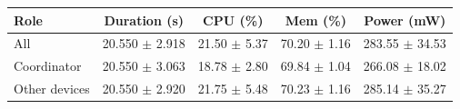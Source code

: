 \begin{tabular}{lcccc}
\hline
\textbf{Role} & \textbf{Duration (s)} & \textbf{CPU (\%)} & \textbf{Mem (\%)} & \textbf{Power (mW)} \\
\hline
All & 20.550 $\pm$ 2.918 & 21.50 $\pm$ 5.37 & 70.20 $\pm$ 1.16 & 283.55 $\pm$ 34.53 \\
Coordinator & 20.550 $\pm$ 3.063 & 18.78 $\pm$ 2.80 & 69.84 $\pm$ 1.04 & 266.08 $\pm$ 18.02 \\
Other devices & 20.550 $\pm$ 2.920 & 21.75 $\pm$ 5.48 & 70.23 $\pm$ 1.16 & 285.14 $\pm$ 35.27 \\
\hline
\end{tabular}
